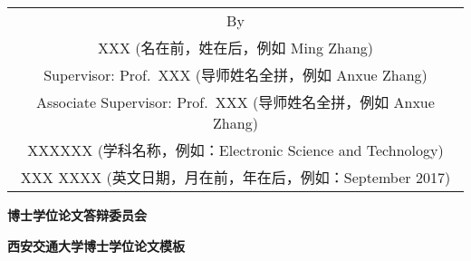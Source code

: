 \begin{titlepage}
\begin{center}
		\vspace{1.4cm}
		{\sanhao
			\begin{center} \renewcommand{\arraystretch}{1.35}
				\begin{tabular}{c}
					By \\
					XXX (名在前，姓在后，例如 Ming Zhang) \\
					Supervisor: Prof.\ XXX (导师姓名全拼，例如 Anxue Zhang) \\
					Associate Supervisor: Prof.\ XXX (导师姓名全拼，例如 Anxue Zhang) \\
					XXXXXX (学科名称，例如：Electronic Science and Technology) \\
					XXX XXXX (英文日期，月在前，年在后，例如：September 2017) \\
				\end{tabular} \renewcommand{\arraystretch}{1}
			\end{center}
		}
	\end{center}
	\clearpage{\pagestyle{empty}\cleardoublepage}
	
	\newpage\thispagestyle{empty}


	\begin{center}
		\parbox[t][0cm][t]{\textwidth}{}
		
		\begin{center}{\bfseries{博士学位论文答辩委员会}}\end{center}
		
		\vspace{1cm}
		\begin{center}{\bfseries{西安交通大学博士学位论文模板}}\end{center}
		

\end{center}
\end{titlepage}

